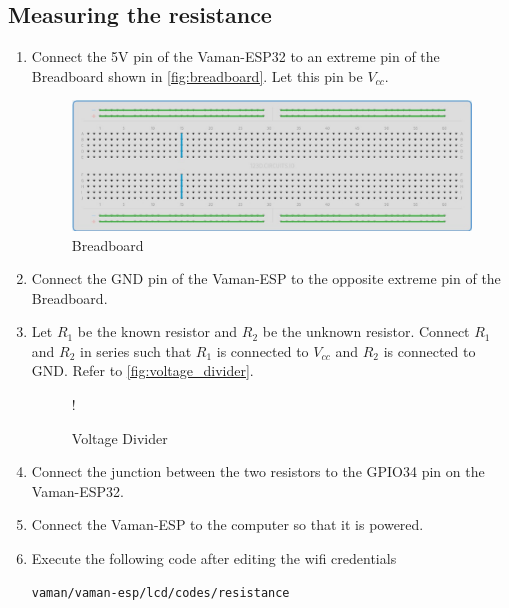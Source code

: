 \subsection{Measuring the resistance}
\begin{enumerate}

\item Connect the 5V pin of the Vaman-ESP32 to an extreme pin of the Breadboard
shown in \autoref{fig:breadboard}. Let this pin be $V_{cc}$.

\begin{figure}[!ht]
\centering
\includegraphics[width=\columnwidth]{vaman-esp32/lcd/figs/breadboard.eps}
\caption{Breadboard}
\label{fig:breadboard}
\end{figure}
%
\item
Connect the GND pin of the Vaman-ESP to the opposite extreme pin of the
Breadboard.

%
\item
Let $R_1$ be the known resistor and $R_2$ be the unknown resistor.  Connect
$R_1$ and $R_2$ in series such that $R_1$ is connected to $V_{cc}$ and $R_2$ is
connected to GND. Refer to \autoref{fig:voltage_divider}.

%
\begin{figure}[!ht]
\centering
\resizebox {\columnwidth} {!} {

}
\caption{Voltage Divider}
\label{fig:voltage_divider}
\end{figure}
%
\item
Connect the junction between the two resistors to  the GPIO34 pin on the
Vaman-ESP32.

%
\item
Connect the Vaman-ESP to the computer so that it is powered.
\item
Execute the following code after editing the wifi credentials

\begin{lstlisting}
vaman/vaman-esp/lcd/codes/resistance
\end{lstlisting}

\end{enumerate}
